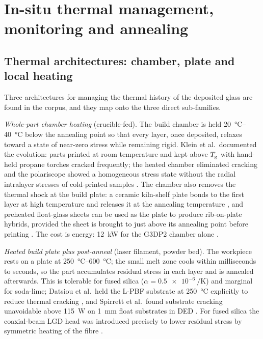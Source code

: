 \section{In-situ thermal management, monitoring and annealing}
\label{sec:monitoring}

\subsection{Thermal architectures: chamber, plate and local heating}
Three architectures for managing the thermal history of the deposited glass are found in the corpus, and they map onto the three direct sub-families.

\emph{Whole-part chamber heating} (crucible-fed). The build chamber is held \SIrange{20}{40}{\celsius} below the annealing point so that every layer, once deposited, relaxes toward a state of near-zero stress while remaining rigid. Klein et al.\ documented the evolution: parts printed at room temperature and kept above \(T_{\mathrm{g}}\) with hand-held propane torches cracked frequently; the heated chamber eliminated cracking and the polariscope showed a homogeneous stress state without the radial intralayer stresses of cold-printed samples \citep{klein2015}. The chamber also removes the thermal shock at the build plate: a ceramic kiln-shelf plate bonds to the first layer at high temperature and releases it at the annealing temperature \citep{klein2015}, and preheated float-glass sheets can be used as the plate to produce rib-on-plate hybrids, provided the sheet is brought to just above its annealing point before printing \citep{stern2024cgc}. The cost is energy: \SI{12}{kW} for the G3DP2 chamber alone \citep{inamura2018}.

\emph{Heated build plate plus post-anneal} (laser filament, powder bed). The workpiece rests on a plate at \SIrange{250}{600}{\celsius}; the small melt zone cools within milliseconds to seconds, so the part accumulates residual stress in each layer and is annealed afterwards. This is tolerable for fused silica (\(\alpha = \SI{0.5e-6}{\per\kelvin}\)) and marginal for soda-lime; Datsiou et al.\ held the L-PBF substrate at \SI{250}{\celsius} explicitly to reduce thermal cracking \citep{datsiou2019}, and Spirrett et al.\ found substrate cracking unavoidable above \SI{115}{W} on \SI{1}{mm} float substrates in DED \citep{spirrett2023}. For fused silica the coaxial-beam LGD head was introduced precisely to lower residual stress by symmetric heating of the fibre \citep{lgd2021coaxial}.

